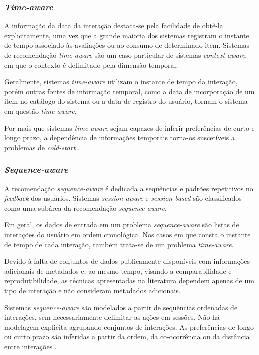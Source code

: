 \subsubsection{\textit{Time-aware}}

A informação da data da interação destaca-se
pela facilidade de obtê-la explicitamente, uma vez que a grande maioria dos
sistemas registram o instante de tempo associado às avaliações ou ao consumo de
determinado item. Sistemas de recomendação \textit{time-aware} são um caso
particular de sistemas \textit{context-aware}, em que o contexto é delimitado
pela dimensão temporal.

Geralmente, sistemas \textit{time-aware} utilizam o instante de tempo da
interação, porém outras fontes de informação temporal, como a data de
incorporação de um item no catálogo do sistema ou a data de registro do usuário,
tornam o sistema em questão \textit{time-aware}.

Por mais que sistemas \textit{time-aware} sejam capazes de inferir preferências
de curto e longo prazo, a dependência de informações temporais torna-os
suscetíveis a problemas de \textit{cold-start} \cite{rec_sys_handbook_2022_multi}.

\subsubsection{\textit{Sequence-aware}}
A recomendação \textit{sequence-aware} é dedicada a sequências e padrões
repetitivos no \textit{feedback} dos usuários. Sistemas \textit{session-aware} e
\textit{session-based} são classificados como uma subárea da recomendação
\textit{sequence-aware}.

Em geral, os dados de entrada em um problema \textit{sequence-aware} são listas
de interações do usuário em ordem cronológica. Nos casos em que consta o instante
de tempo de cada interação, também trata-se de um problema \textit{time-aware}.

Devido à falta de conjuntos de
dados publicamente disponíveis com informações adicionais de metadados e, ao
mesmo tempo, visando a comparabilidade e reprodutibilidade, as técnicas
apresentadas na literatura dependem apenas de um tipo de
interação e não consideram metadados adicionais.

Sistemas \textit{sequence-aware} são modelados a partir de sequências ordenadas
de interações, sem necessariamente delimitar as ações em sessões. Não há
modelagem explicita agrupando conjuntos de interações. As preferências de longo
ou curto prazo são inferidas a partir da ordem, da co-ocorrência ou da distância
entre interações \cite{sessionbaseddp, quadrana2018sequence}.


